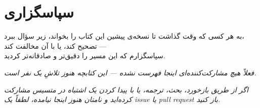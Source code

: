 \chapter*{سپاسگزاری}
\thispagestyle{plain}

\vspace*{1cm}

\begin{center}
	\large
	به هر کسی که وقت گذاشت تا نسخه‌ی پیشین این کتاب را بخواند، زیر سؤال ببرد،\\
	تصحیح کند، یا با آن مخالفت کند —\\
	سپاسگزارم که این مسیر را دقیق‌تر و صادقانه‌تر کردید.
\end{center}

\vspace{0.6cm}

\begin{center}
	\small\itshape\color{textsecondary}
	فعلاً هیچ مشارکت‌کننده‌ای اینجا فهرست نشده --- این کتابچه هنوز
	تلاشِ یک نفر است.
\end{center}

\vfill

\begin{center}
	\small\textit{
		اگر از طریق بازخورد، بحث، ترجمه، یا با پیدا کردن یک اشتباه در
		متسیس مشارکت کرده‌اید و نامتان هنوز اینجا نیامده، لطفاً یک
		issue یا pull request باز کنید.
	}
\end{center}

\clearpage
